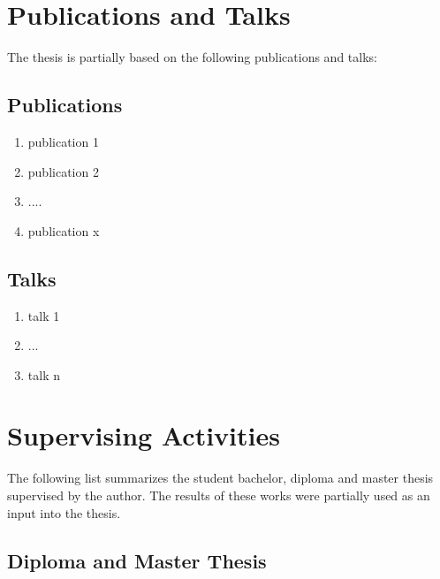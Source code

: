 \begin{appendix}

\chapter{Publications and Talks}
The thesis is partially based on the following publications and talks:
\section{Publications}




\begin{enumerate}
\item publication 1
\item publication 2
\item ....
\item publication x
\end{enumerate}

\newpage
\section{Talks}

\begin{enumerate}
\item talk 1
\item ...
\item talk n
\end{enumerate}

\chapter{Supervising Activities}

The following list summarizes the student bachelor, diploma and master thesis supervised by the author. The results of these works were partially used as an input into the thesis.

\section{Diploma and Master Thesis}


\end{appendix}
